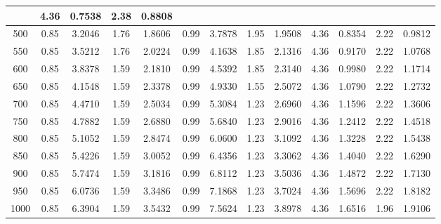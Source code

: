 \documentclass[12pt]{article}
\begin{document}
\begin{table}[H]
{\begin{tabular}{ |c |c | c | c | c | c | c | c | c | c | c | c | c | }
      & 4.36 & 0.7538 & 2.38 & 0.8808 \\ \hline
      500
      & 0.85 & 3.2046 & 1.76 & 1.8606
      & 0.99 & 3.7878 & 1.95 & 1.9508
      & 4.36 & 0.8354 & 2.22 & 0.9812 \\ \hline
      550
      & 0.85 & 3.5212 & 1.76 & 2.0224
      & 0.99 & 4.1638 & 1.85 & 2.1316
      & 4.36 & 0.9170 & 2.22 & 1.0768 \\ \hline
      600
      & 0.85 & 3.8378 & 1.59 & 2.1810
      & 0.99 & 4.5392 & 1.85 & 2.3140
      & 4.36 & 0.9980 & 2.22 & 1.1714 \\ \hline
      650
      & 0.85 & 4.1548 & 1.59 & 2.3378
      & 0.99 & 4.9330 & 1.55 & 2.5072
      & 4.36 & 1.0790 & 2.22 & 1.2732 \\ \hline
      700
      & 0.85 & 4.4710 & 1.59 & 2.5034
      & 0.99 & 5.3084 & 1.23 & 2.6960
      & 4.36 & 1.1596 & 2.22 & 1.3606 \\ \hline
      750
      & 0.85 & 4.7882 & 1.59 & 2.6880
      & 0.99 & 5.6840 & 1.23 & 2.9016
      & 4.36 & 1.2412 & 2.22 & 1.4518 \\ \hline
      800
      & 0.85 & 5.1052 & 1.59 & 2.8474
      & 0.99 & 6.0600 & 1.23 & 3.1092
      & 4.36 & 1.3228 & 2.22 & 1.5438 \\ \hline
      850
      & 0.85 & 5.4226 & 1.59 & 3.0052
      & 0.99 & 6.4356 & 1.23 & 3.3062
      & 4.36 & 1.4040 & 2.22 & 1.6290 \\ \hline
      900
      & 0.85 & 5.7474 & 1.59 & 3.1816
      & 0.99 & 6.8112 & 1.23 & 3.5036
      & 4.36 & 1.4872 & 2.22 & 1.7130 \\ \hline
      950
      & 0.85 & 6.0736 & 1.59 & 3.3486
      & 0.99 & 7.1868 & 1.23 & 3.7024
      & 4.36 & 1.5696 & 2.22 & 1.8182 \\ \hline
      1000
      & 0.85 & 6.3904 & 1.59 & 3.5432
      & 0.99 & 7.5624 & 1.23 & 3.8978
      & 4.36 & 1.6516 & 1.96 & 1.9106 \\ \hline
    \end{tabular}
  }
\end{table}
\end{document}

